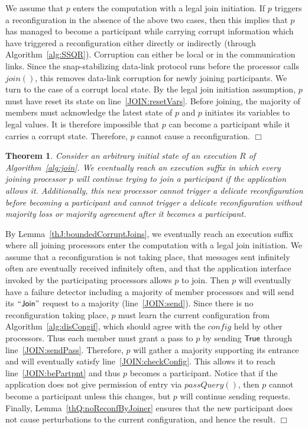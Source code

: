 \documentclass[11pt]{article}
\newtheorem{theorem}{Theorem}[section]
\newenvironment{proof}{\noindent{\bf Proof.}}{\hfill$\Box$}
\begin{document}
\begin{proof}
We assume that $p$ enters the computation with a legal join initiation. 
If $p$ triggers a reconfiguration in the absence of the above two cases, then this implies that $p$ has managed to become a participant while carrying corrupt information which have triggered a reconfiguration either directly or indirectly (through Algorithm~\ref{alg:SSQR}).
Corruption can either be local or in the communication links.
Since the snap-stabilizing data-link protocol runs before the processor calls $join()$, this removes data-link corruption for newly joining participants. 
We turn to the case of a corrupt local state.
By the legal join initiation assumption, $p$ must have reset its state on line~\ref{JOIN:resetVars}.
Before joining, the majority of members must acknowledge the latest state of $p$ and $p$ initiates its variables to legal values.
It is therefore impossible that $p$ can become a participant while it carries a corrupt state.
Therefore, $p$ cannot cause a reconfiguration.
\end{proof}

\begin{theorem}
\label{thJ:finalApp}
Consider an arbitrary initial state of an execution $R$ of Algorithm~\ref{alg:join}. 
We eventually reach an execution suffix in which every joining processor $p$ will continue trying to join a participant if the application allows it. Additionally, this new processor cannot trigger a delicate reconfiguration before becoming a participant and cannot trigger a delicate reconfiguration without majority loss or majority agreement after it becomes a participant.
\end{theorem}

\begin{proof}
By Lemma~\ref{thJ:boundedCorruptJoins}, we eventually reach an execution suffix where all joining processors enter the computation with a legal join initiation.
We assume that a reconfiguration is not taking place, that messages sent infinitely often are eventually received infinitely often, and that the application interface invoked by the participating processors allows $p$ to join. 
Then $p$ will eventually have a failure detector including a majority of member processors and will send its $\sf ``Join"$ request to a majority (line~\ref{JOIN:send}).
Since there is no reconfiguration taking place, $p$ must learn the current configuration from Algorithm~\ref{alg:disCongif}, which should agree with the $config$ held by other processors.
Thus each member must grant a pass to $p$ by sending $\sf True$ through line~\ref{JOIN:sendPass}.
Therefore, $p$ will gather a majority supporting its entrance and will eventually satisfy line~\ref{JOIN:checkConfig}.
This allows it to reach line~\ref{JOIN:bePartpnt} and thus $p$ becomes a participant.
Notice that if the application does not give permission of entry via $passQuery()$, then $p$ cannot become a participant unless this changes, but $p$ will continue sending requests.
Finally, Lemma~\ref{thQ:noReconfByJoiner} ensures that the new participant does not cause perturbations to the current configuration, and hence the result. 
\end{proof}
\end{document}
